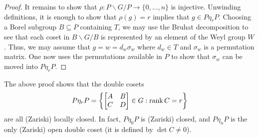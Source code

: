 \begin{proof}
    It remains to show that $\rho\colon P\backslash G/P\to\{0,
    \ldots,n\}$ is injective. Unwinding definitions, it is enough to show that $\rho(g)=r$ implies that $g\in P\eta_rP$. Choosing a Borel subgroup $B\subseteq P$ containing $T$, we may use the Bruhat decomposition to see that each coset in $B\backslash G/B$ is represented by an element of the Weyl group $W$. Thus, we may assume that $g=w=d_w\sigma_w$ where $d_w\in T$ and $\sigma_w$ is a permutation matrix. One now uses the permutations available in $P$ to show that $\sigma_w$ can be moved into $P\eta_rP$.
\end{proof}
\begin{remark}
    The above proof shows that the double cosets
    \[P\eta_rP=\left\{\begin{bmatrix}
        A & B \\ C & D
    \end{bmatrix}\in G:\operatorname{rank}C=r\right\}\]
    are all (Zariski) locally closed. In fact, $P\eta_0P$ is (Zariski) closed, and $P\eta_nP$ is the only (Zariski) open double coset (it is defined by $\det C\ne0$).
\end{remark}


